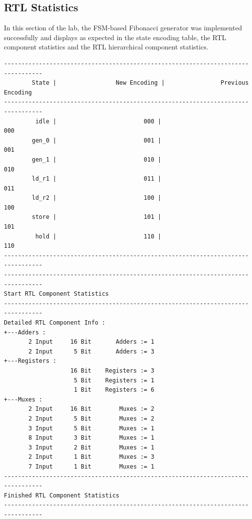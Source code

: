 \documentclass[10pt]{article}
\begin{document}
\subsection {RTL Statistics}
In this section of the lab, the FSM-based Fibonacci generator was implemented successfully and displays as
expected in the state encoding table, the RTL component statistics and the RTL hierarchical component statistics.
\begin{verbatim}
---------------------------------------------------------------------------------
        State |                 New Encoding |                Previous Encoding 
---------------------------------------------------------------------------------
         idle |                         000 |                              000
        gen_0 |                         001 |                              001
        gen_1 |                         010 |                              010
        ld_r1 |                         011 |                              011
        ld_r2 |                         100 |                              100
        store |                         101 |                              101
         hold |                         110 |                              110
---------------------------------------------------------------------------------
---------------------------------------------------------------------------------
Start RTL Component Statistics 
---------------------------------------------------------------------------------
Detailed RTL Component Info : 
+---Adders : 
	   2 Input     16 Bit       Adders := 1     
	   2 Input      5 Bit       Adders := 3     
+---Registers : 
	               16 Bit    Registers := 3     
	                5 Bit    Registers := 1     
	                1 Bit    Registers := 6     
+---Muxes : 
	   2 Input     16 Bit        Muxes := 2     
	   2 Input      5 Bit        Muxes := 2     
	   3 Input      5 Bit        Muxes := 1     
	   8 Input      3 Bit        Muxes := 1     
	   3 Input      2 Bit        Muxes := 1     
	   2 Input      1 Bit        Muxes := 3     
	   7 Input      1 Bit        Muxes := 1     
---------------------------------------------------------------------------------
Finished RTL Component Statistics 
---------------------------------------------------------------------------------
\end{verbatim}
\newpage
\end{document}
